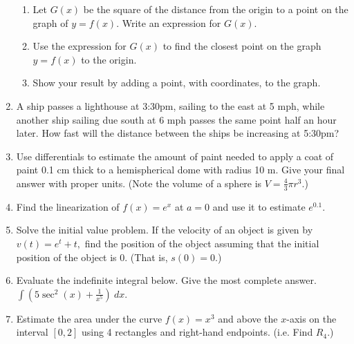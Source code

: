 \documentclass[12pt]{article}
\begin{document}
\begin{enumerate}
\begin{enumerate}
\item  Let $G(x)$ be the square of the distance from the origin to a point on the graph of $y=f(x)$.  Write an expression for $G(x)$.

\item Use the expression for $G(x)$ to find the closest point on the graph $y=f(x)$ to the origin.

\item  Show your result by adding a point, with coordinates, to the graph.
\end{enumerate}

\item A ship passes a lighthouse at 3:30pm, sailing to the east at 5 mph, while another ship sailing due south at 6 mph passes the same point half an hour later.  How fast will the distance between the ships be increasing at 5:30pm?
\item Use differentials to estimate the amount of paint needed to apply a coat of paint 0.1 cm thick to a hemispherical dome with radius 10 m. Give your final answer with proper units. (Note the volume of a sphere is $V=\frac{4}{3} \pi r^3.$)
\item Find the linearization of $f(x)=e^x$ at $a=0$ and use it to estimate $e^{0.1}.$
\item Solve the initial value problem. If the velocity of an object is given by $v(t)=e^{t} +t,$ find the position of the object assuming that the initial position of the object is $0.$ (That is, $s(0)=0.$)
\item Evaluate the indefinite integral below. Give the most complete answer.
$\int (5\sec^2(x) + \frac{1}{x^5}) \: dx$.
\item Estimate the area under the curve $f(x)=x^3$ and above the $x$-axis on the interval $[0,2]$ using 4 rectangles and right-hand endpoints. (i.e. Find $R_4.$)
\end{enumerate}
\end{document}
